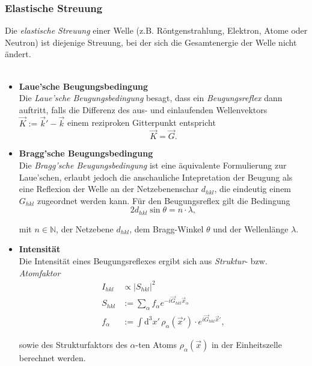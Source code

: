 \documentclass{article}
\newcommand{\diff}{\mathrm{d}}
\begin{document}
\newpage


\subsubsection{Elastische Streuung}
Die \textit{elastische Streuung} einer Welle (z.B. Röntgenstrahlung, Elektron, Atome oder Neutron) ist diejenige Streuung, bei der sich die Gesamtenergie der Welle nicht ändert.\\
\\
	\begin{itemize}
		\item \textbf{Laue'sche Beugungsbedingung}\\
		Die \textit{Laue'sche Beugungsbedingung} besagt, dass ein \textit{Beugungsreflex} dann auftritt, falls die Differenz des aus- und einlaufenden Wellenvektors $\vec{K} := \vec{k}'-\vec{k}$ einem reziproken Gitterpunkt entspricht
			\begin{equation}
				\vec{K} = \vec{G}.
			\end{equation}
		
		
		\item \textbf{Bragg'sche Beugungsbedingung}\\
		Die \textit{Bragg'sche Beugungsbedingung} ist eine äquivalente Formulierung zur Laue'schen, erlaubt jedoch die anschauliche Intepretation der Beugung als eine Reflexion der Welle an der Netzebenenschar $d_{hkl}$, die eindeutig einem $G_{hkl}$ zugeordnet werden kann. Für den Beugungsreflex gilt die Bedingung
			\begin{equation}
				2d_{hkl}\sin\theta = n \cdot \lambda,
			\end{equation}
		
		mit $n\in\mathbb{N}$, der Netzebene $d_{hkl}$, dem Bragg-Winkel $\theta$ und der Wellenlänge $\lambda$.
		
		
		\item \textbf{Intensität}\\
		Die Intensität eines Beugungsreflexes ergibt sich aus \textit{Struktur}- bzw. \textit{Atomfaktor}
			\begin{align}
				I_{hkl} &\propto \left| S_{hkl} \right|^2 \\ 
				S_{hkl} &:= \sum_\alpha f_\alpha e^{-i\vec{G}_{hkl}\vec{x}_\alpha} \\
				f_\alpha &:= \int \diff^3x' \, \rho_\alpha(\vec{x}') \cdot e^{i\vec{G}_{hkl}\vec{x}'},
			\end{align}

		sowie des Strukturfaktors des $\alpha$-ten Atoms $\rho_\alpha(\vec{x})$ in der Einheitszelle berechnet werden.
	\end{itemize}
\end{document}
